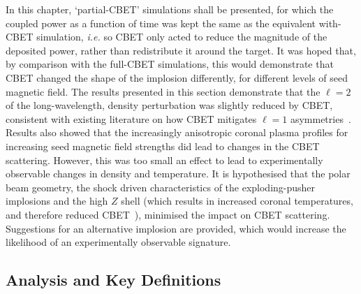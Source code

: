 In this chapter, `partial-\ac{CBET}' simulations shall be presented, for which the coupled power as a function of time was kept the same as the equivalent with-\ac{CBET} simulation, \textit{i.e.} so \ac{CBET} only acted to reduce the magnitude of the deposited power, rather than redistribute it around the target.
It was hoped that, by comparison with the full-\ac{CBET} simulations, this would demonstrate that \ac{CBET} changed the shape of the implosion differently, for different levels of seed magnetic field.
The results presented in this section demonstrate that the $\ell=2$ of the long-wavelength, density perturbation was slightly reduced by \ac{CBET}, consistent with existing literature on how \ac{CBET} mitigates $\ell=1$ asymmetries~\cite{colaitis_inverse_2021}.
Results also showed that the increasingly anisotropic coronal plasma profiles for increasing seed magnetic field strengths did lead to changes in the \ac{CBET} scattering.
However, this was too small an effect to lead to experimentally observable changes in density and temperature.
It is hypothesised that the polar beam geometry, the shock driven characteristics of the exploding-pusher implosions and the high $Z$ shell (which results in increased coronal temperatures, and therefore reduced \ac{CBET}~\cite{colaitis_exploration_2023}), minimised the impact on \ac{CBET} scattering.
Suggestions for an alternative implosion are provided, which would increase the likelihood of an experimentally observable signature.

\subsection{Analysis and Key Definitions}%
\label{sec:Res2_analysis_definitions}

